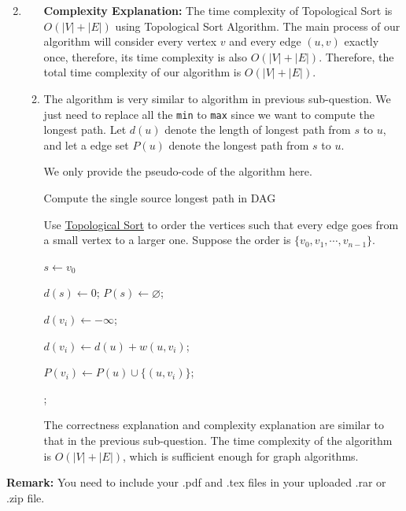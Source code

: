 \documentclass[12pt,a4paper]{article}
\makeatletter
\newtheorem*{solution}{Solution}
\theoremstyle{definition}
\renewenvironment{solution}[1][Solution] {\par\pushQED{\qed}\normalfont\topsep6\p@\@plus6\p@\relax\trivlist\item[\hskip\labelsep\bfseries#1\@addpunct{.}]\ignorespaces}{\popQED\endtrivlist\@endpefalse} \makeatother
\makeatother
\begin{document}
\begin{enumerate}
\begin{solution}
\begin{enumerate}
        \textbf{Complexity Explanation: } The time complexity of Topological Sort is $O(|V| + |E|)$ using Topological Sort Algorithm. The main process of our algorithm will consider every vertex $v$ and every edge $(u, v)$ exactly once, therefore, its time complexity is also $O(|V| + |E|)$. Therefore, the total time complexity of our algorithm is $O(|V| + |E|)$.
    \item The algorithm is very similar to algorithm in previous sub-question. We just need to replace all the \texttt{min} to \texttt{max} since we want to compute the longest path. Let $d(u)$ denote the length of longest path from $s$ to $u$, and let a edge set $P(u)$ denote the longest path from $s$ to $u$.

        We only provide the pseudo-code of the algorithm here.

        \begin{minipage}[t]{0.8\textwidth}
        \begin{algorithm}[H]

            \BlankLine
            \caption{Compute the single source longest path in DAG}
            \label{alg1}

            Use \underline{Topological Sort} to order the vertices such that every edge goes from a small vertex to a larger one. Suppose the order is $\{v_0, v_1, \cdots, v_{n-1}\}$.

            $s \leftarrow v_0$ 

            $d(s) \leftarrow 0$; $P(s) \leftarrow \varnothing$;

             {
                $d(v_i) \leftarrow -\infty$;

                 {
                     {
                        $d(v_i) \leftarrow d(u) + w(u, v_i)$;

                        $P(v_i) \leftarrow P(u) \cup \{ (u, v_i) \}$;
                    }
                }
            }
            ;
        \end{algorithm}
        \end{minipage}

        The correctness explanation and complexity explanation are similar to that in the previous sub-question. The time complexity of the algorithm is $O(|V| + |E|)$, which is sufficient enough for graph algorithms.
    \end{enumerate}
    \end{solution}

\end{enumerate}

\vspace{20pt}

\textbf{Remark:} You need to include your .pdf and .tex files in your uploaded .rar or .zip file.

\end{document}
